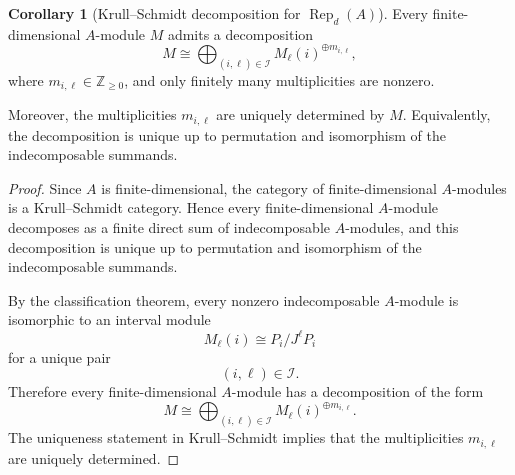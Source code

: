 \documentclass[11pt]{article}
\newcommand{\Rep}{\operatorname{Rep}}
\theoremstyle{definition}
\newtheorem{corollary}[theorem]{Corollary}
\begin{document}
\begin{corollary}[Krull--Schmidt decomposition for \(\Rep_d(A)\)]
Every finite-dimensional \(A\)-module \(M\) admits a decomposition
\[
M
\cong
\bigoplus_{(i,\ell)\in \mathcal I}
M_{\ell}(i)^{\oplus m_{i,\ell}},
\]
where \(m_{i,\ell}\in \mathbb Z_{\geq 0}\), and only finitely many
multiplicities are nonzero.

Moreover, the multiplicities \(m_{i,\ell}\) are uniquely determined by
\(M\). Equivalently, the decomposition is unique up to permutation and
isomorphism of the indecomposable summands.
\end{corollary}

\begin{proof}
Since \(A\) is finite-dimensional, the category of finite-dimensional
\(A\)-modules is a Krull--Schmidt category. Hence every finite-dimensional
\(A\)-module decomposes as a finite direct sum of indecomposable
\(A\)-modules, and this decomposition is unique up to permutation and
isomorphism of the indecomposable summands.

By the classification theorem, every nonzero indecomposable
\(A\)-module is isomorphic to an interval module
\[
M_{\ell}(i)\cong P_i/J^{\ell} P_i
\]
for a unique pair
\[
(i,\ell)\in \mathcal I.
\]
Therefore every finite-dimensional \(A\)-module has a decomposition of
the form
\[
M
\cong
\bigoplus_{(i,\ell)\in \mathcal I}
M_{\ell}(i)^{\oplus m_{i,\ell}}.
\]
The uniqueness statement in Krull--Schmidt implies that the
multiplicities \(m_{i,\ell}\) are uniquely determined.
\end{proof}
\end{document}
